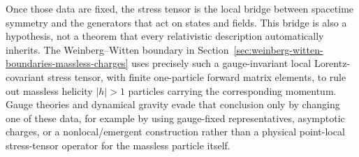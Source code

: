 Once those data are fixed, the stress tensor is the local bridge between
spacetime symmetry and the generators that act on states and fields.
This bridge is also a hypothesis, not a theorem that every relativistic
description automatically inherits.  The Weinberg--Witten boundary in
Section~\ref{sec:weinberg-witten-boundaries-massless-charges} uses precisely
such a gauge-invariant local Lorentz-covariant stress tensor, with finite
one-particle forward matrix elements, to rule out massless helicity
\(|h|>1\) particles carrying the corresponding momentum.  Gauge theories and
dynamical gravity evade that conclusion only by changing one of these data,
for example by using gauge-fixed representatives, asymptotic charges, or a
nonlocal/emergent construction rather than a physical point-local
stress-tensor operator for the massless particle itself.
